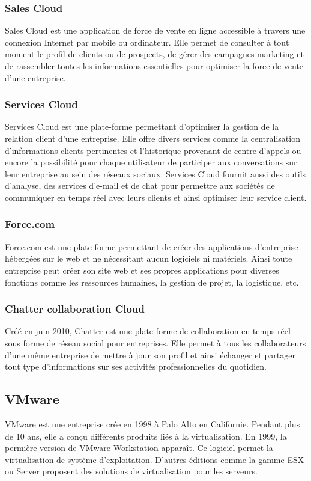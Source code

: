 \documentclass[a4paper,12pt]{report}
\begin{document}
\begin{onehalfspace}
	\subsubsection{Sales Cloud}
Sales Cloud est une application de force de vente en ligne accessible à travers une connexion Internet par mobile ou ordinateur. Elle permet de consulter à tout moment le profil de clients ou de prospects, de gérer des campagnes marketing et de rassembler toutes les informations essentielles pour optimiser la force de vente d'une entreprise.

	\subsubsection{Services Cloud}
Services Cloud est une plate-forme permettant d'optimiser la gestion de la relation client d’une entreprise. Elle offre divers services comme la centralisation d'informations clients pertinentes et l’historique provenant de centre d’appels ou encore la possibilité pour chaque utilisateur de participer aux conversations sur leur entreprise au sein des réseaux sociaux. Services Cloud fournit aussi des outils d’analyse, des services d'e-mail et de chat pour permettre aux sociétés de communiquer en temps réel avec leurs clients et ainsi optimiser leur service client.

	\subsubsection{Force.com}
Force.com est une plate-forme permettant de créer des applications d’entreprise hébergées sur le web et ne nécessitant aucun logiciels ni matériels. Ainsi toute entreprise peut créer son site web et ses propres applications pour diverses fonctions comme les ressources humaines, la gestion de projet, la logistique, etc.

	\subsubsection{Chatter collaboration Cloud}
Créé en juin 2010, Chatter est une plate-forme de collaboration en temps-réel sous forme de réseau social pour entreprises. Elle permet à tous les collaborateurs d’une même entreprise de mettre à jour son profil et ainsi échanger et partager tout type d’informations sur ses activités professionnelles du quotidien.
	

	\subsection{VMware}
	VMware est une entreprise crée en 1998 à Palo Alto en Californie. Pendant plus de 10 ans, elle a conçu différents produits liés à la virtualisation. En 1999, la permière version de VMware Workstation apparaît. Ce logiciel permet la virtualisation de système d’exploitation. D’autres éditions comme la gamme ESX ou Server proposent des solutions de virtualisation pour les serveurs.


\end{onehalfspace}
\end{document}
